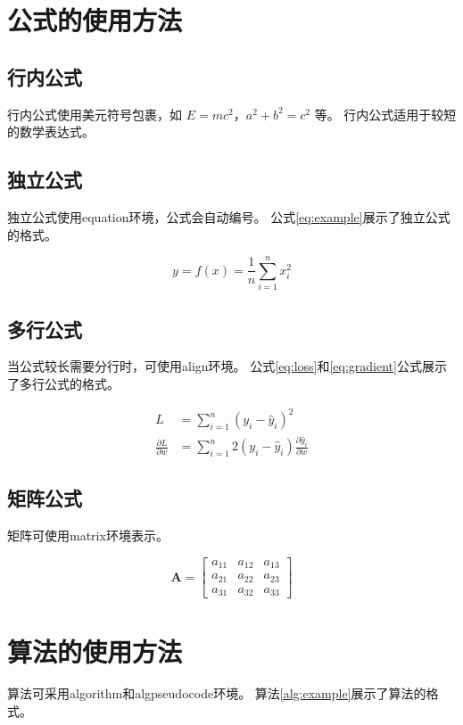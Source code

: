 \section{公式的使用方法}
\subsection{行内公式}
行内公式使用美元符号包裹，如 $E = mc^2$，$a^2 + b^2 = c^2$ 等。
行内公式适用于较短的数学表达式。

\subsection{独立公式}
独立公式使用equation环境，公式会自动编号。
公式\ref{eq:example}展示了独立公式的格式。

\begin{equation}
    y = f(x) = \frac{1}{n}\sum_{i=1}^{n} x_i^2
    \label{eq:example}
\end{equation}

\subsection{多行公式}
当公式较长需要分行时，可使用align环境。
公式\ref{eq:loss}和\ref{eq:gradient}公式展示了多行公式的格式。

\begin{align}
    L &= \sum_{i=1}^{n} \left( y_i - \hat{y}_i \right)^2 \label{eq:loss} \\
    \frac{\partial L}{\partial w} &= \sum_{i=1}^{n} 2\left( y_i - \hat{y}_i \right) \frac{\partial \hat{y}_i}{\partial w} \label{eq:gradient}
\end{align}

\subsection{矩阵公式}
矩阵可使用matrix环境表示。

\begin{equation}
    \mathbf{A} = \begin{bmatrix}
        a_{11} & a_{12} & a_{13} \\
        a_{21} & a_{22} & a_{23} \\
        a_{31} & a_{32} & a_{33}
    \end{bmatrix}
    \label{eq:matrix}
\end{equation}

\section{算法的使用方法}
算法可采用algorithm和algpseudocode环境。
算法\ref{alg:example}展示了算法的格式。

